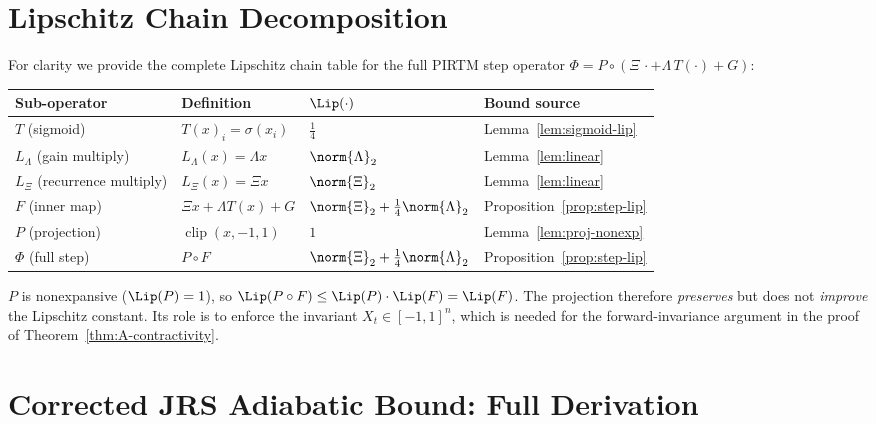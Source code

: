 \documentclass[11pt,letterpaper]{article}
\theoremstyle{remark}
\begin{document}
\section{Lipschitz Chain Decomposition}
\label{sec:lipchain}

For clarity we provide the complete Lipschitz chain table for the
full PIRTM step operator $\Phi = P \circ (\Xi\, \cdot + \Lambda\, T(\cdot) + G)$:

\begin{center}
\renewcommand{\arraystretch}{1.4}
\begin{tabular}{llll}
\toprule
\textbf{Sub-operator} & \textbf{Definition} & $\Lip(\cdot)$ & \textbf{Bound source} \\
\midrule
$T$ (sigmoid) & $T(x)_i = \sigma(x_i)$ & $\tfrac{1}{4}$ & Lemma~\ref{lem:sigmoid-lip} \\
$L_\Lambda$ (gain multiply) & $L_\Lambda(x) = \Lambda x$ & $\norm{\Lambda}_2$ & Lemma~\ref{lem:linear} \\
$L_\Xi$ (recurrence multiply) & $L_\Xi(x) = \Xi x$ & $\norm{\Xi}_2$ & Lemma~\ref{lem:linear} \\
$F$ (inner map) & $\Xi x + \Lambda T(x) + G$ & $\norm{\Xi}_2 + \frac{1}{4}\norm{\Lambda}_2$ & Proposition~\ref{prop:step-lip} \\
$P$ (projection) & $\operatorname{clip}(x,-1,1)$ & $1$ & Lemma~\ref{lem:proj-nonexp} \\
$\Phi$ (full step) & $P \circ F$ & $\norm{\Xi}_2 + \frac{1}{4}\norm{\Lambda}_2$ & Proposition~\ref{prop:step-lip} \\
\bottomrule
\end{tabular}
\end{center}

\begin{remark}
$P$ is nonexpansive ($\Lip(P) = 1$), so $\Lip(P \circ F) \leq
\Lip(P) \cdot \Lip(F) = \Lip(F)$. The projection therefore
\emph{preserves} but does not \emph{improve} the Lipschitz constant.
Its role is to enforce the invariant $X_t \in [-1,1]^n$, which is
needed for the forward-invariance argument in the proof of
Theorem~\ref{thm:A-contractivity}.
\end{remark}

\section{Corrected JRS Adiabatic Bound: Full Derivation}
\label{sec:jrs}
\end{document}
